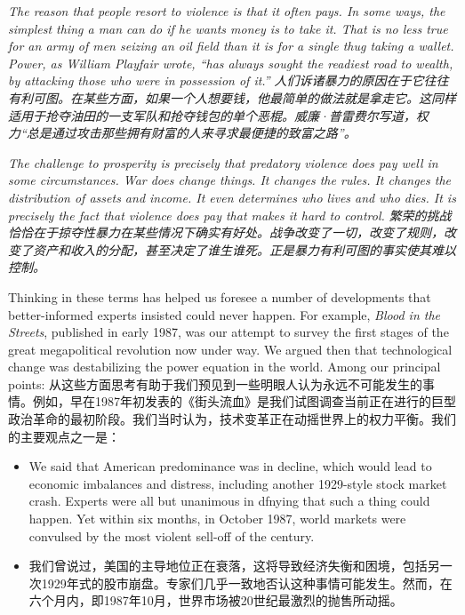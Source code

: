 \begin{Parallel}{97mm}{45mm}
  \ParallelLText
  {\emph{The reason that people resort to violence is that it often pays. In some ways, the simplest thing a man can do if he wants money is to take it. That is no less true for an army of men seizing an oil field than it is for a single thug taking a wallet. Power, as William Playfair wrote, “has always sought the readiest road to wealth, by attacking those who were in possession of it.” }}
  \ParallelRText
  {\small \emph{人们诉诸暴力的原因在于它往往有利可图。在某些方面，如果一个人想要钱，他最简单的做法就是拿走它。这同样适用于抢夺油田的一支军队和抢夺钱包的单个恶棍。威廉·普雷费尔写道，权力“总是通过攻击那些拥有财富的人来寻求最便捷的致富之路”。}}
  \ParallelPar

  \ParallelLText
  {\emph{The challenge to prosperity is precisely that predatory violence does pay well in some circumstances. War does change things. It changes the rules. It changes the distribution of assets and income. It even determines who lives and who dies. It is precisely the fact that violence does pay that makes it hard to control. }}
  \ParallelRText
  {\small \emph{繁荣的挑战恰恰在于掠夺性暴力在某些情况下确实有好处。战争改变了一切，改变了规则，改变了资产和收入的分配，甚至决定了谁生谁死。正是暴力有利可图的事实使其难以控制。}}
  \ParallelPar

  \ParallelLText
  {Thinking in these terms has helped us foresee a number of developments that better-informed experts insisted could never happen. For example, \emph{Blood in the Streets}, published in early 1987, was our attempt to survey the first stages of the great megapolitical revolution now under way. We argued then that technological change was destabilizing the power equation in the world. Among our principal points:  }  
  \ParallelRText
  {\small 从这些方面思考有助于我们预见到一些明眼人认为永远不可能发生的事情。例如，早在1987年初发表的《街头流血》是我们试图调查当前正在进行的巨型政治革命的最初阶段。我们当时认为，技术变革正在动摇世界上的权力平衡。我们的主要观点之一是：}
  \ParallelPar

\end{Parallel}

\begin{itemize}
\item We said that American predominance was in decline, which would lead to economic imbalances and distress, including another 1929-style stock market crash. Experts were all but unanimous in dfnying that such a thing could happen. Yet within six months, in October 1987, world markets were convulsed by the most violent sell-off of the century.
\item \small 我们曾说过，美国的主导地位正在衰落，这将导致经济失衡和困境，包括另一次1929年式的股市崩盘。专家们几乎一致地否认这种事情可能发生。然而，在六个月内，即1987年10月，世界市场被20世纪最激烈的抛售所动摇。
\end{itemize}

